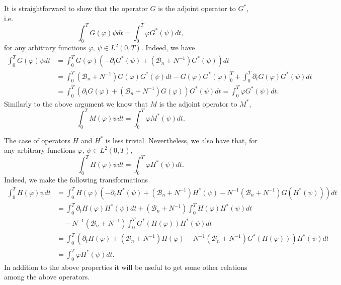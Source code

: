 \documentclass[reqno]{amsart}
\begin{document}
It is straightforward to show that the operator $G$ is the adjoint operator
to $G^{\ast }$, i.e.
\begin{equation}
\int _0^{T}G(\varphi )\psi {dt}=\int _0^{T}\varphi G^{\ast
}(\psi ){dt},  \label{G adj rel}
\end{equation}%
for any arbitrary functions $\varphi ,\, \psi \in L^2(0,T)$. Indeed, we
have
\begin{align*}
\int _0^{T}G(\varphi )\psi {dt}
&=\int _0^{T}G(\varphi
 )(-\partial _{t}G^{\ast }(\psi )+(\mathcal{B}_n+N^{-1})G^{\ast }(\psi )){dt} \\
&=\int _0^{T}(\mathcal{B}_n+N^{-1})G(\varphi )G^{\ast }(\psi ){dt}%
-G(\varphi )G^{\ast }(\varphi )\Big \vert_0^{T}+\int
_0^{T}\partial _{t}G(\varphi )G^{\ast }(\psi ){dt} \\
&=\int _0^{T}(\partial _{t}G(\varphi )+(\mathcal{B}
_n+N^{-1})G(\varphi ))G^{\ast }(\psi ){dt}=\int _0^{T}\varphi
G^{\ast }(\psi ){dt}.
\end{align*}
Similarly to the above argument we know that $M$ is the adjoint operator to 
$M^{\ast }$,
\[
\int _0^{T}M(\varphi )\psi {dt}=\int _0^{T}\varphi M^{\ast
}(\psi ){dt}.
\]

The case of operators $H$ and $H^{\ast }$ is less trivial. 
Nevertheless, we also have that, for any arbitrary functions 
$\varphi ,\, \psi \in L^2(0,T)$,
\begin{equation}
\int _0^{T}H(\varphi )\psi {dt} 
=\int _0^{T}\varphi H^{\ast
}(\psi ){dt}.  \label{H adj rel}
\end{equation}
Indeed, we make the following transformations
\begin{align*}
\int _0^{T}H(\varphi )\psi {dt}
&=\int _0^{T}H(\varphi )(-\partial _{t}H^{\ast }(\psi )
 +(\mathcal{B}_n+N^{-1})H^{\ast }(\psi)-N^{-1}
  (\mathcal{B}_n+N^{-1})G(H^{\ast }(\psi ))){dt} \\
&=\int _0^{T}\partial _{t}H(\varphi )H^{\ast }(\psi ){dt}
 +(\mathcal{B}_n+N^{-1})\int _0^{T}H(\varphi )H^{\ast }(\psi ){dt} \\
&\quad -N^{-1}(\mathcal{B}_n+N^{-1})\int _0^{T}G^{\ast }(H(\varphi
 ))H^{\ast }(\psi ){dt} \\
&=\int _0^{T}(\partial _{t}H(\varphi )+(\mathcal{B} _n+N^{-1})H(\varphi )
 -N^{-1}(\mathcal{B}_n+N^{-1})G^{\ast }(H(\varphi)))H^{\ast }(\psi ){dt} \\
&=\int _0^{T}\varphi H^{\ast }(\psi ){dt.}
\end{align*}
In addition to the above properties it will be useful to get some other
relations among the above operators.
\end{document}
